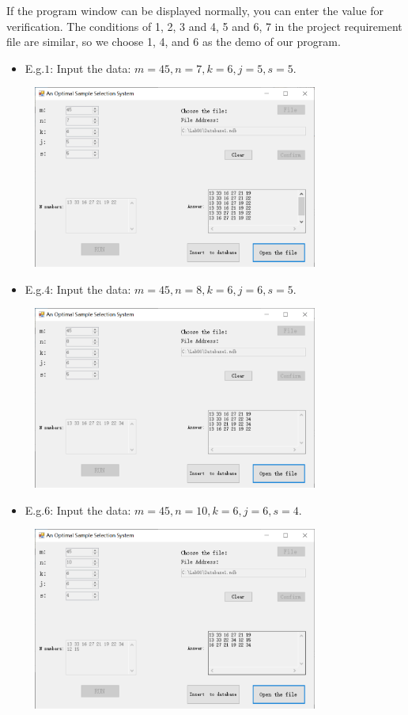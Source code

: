If the program window can be displayed normally, you can enter the value for verification. The conditions of 1, 2, 3 and 4, 5 and 6, 7 in the project requirement file are similar, so we choose 1, 4, and 6 as the demo of our program.
\begin{itemize}
\item E.g.$1$: Input the data: $m=45, n=7, k=6, j=5, s=5.$
\begin{center}
    \includegraphics[width=10cm,height=6cm]{images/1.png}
\end{center}

\item E.g.$4$: Input the data: $m=45, n=8, k=6, j=6, s=5.$
\begin{center}
    \includegraphics[width=10cm,height=6cm]{images/4.png}
\end{center}

\item E.g.$6$: Input the data: $m=45, n=10, k=6, j=6, s=4.$
\begin{center}
    \includegraphics[width=10cm,height=6cm]{images/6.png}
\end{center}

\end{itemize}

